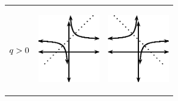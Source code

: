 \begin{center}
\begin{xtabular*}{\mytablewidth}[t]{|p{10\mystarwidth}|p{10\mystarwidth}|p{10\mystarwidth}|}
    
        
                  \begin{math}q>{}0\end{math}
                 &
    
    
        
                  
    \setcounter{subfigure}{0}

\label{m39341*id246931}
    \begin{center}
    \label{m39341*id246931!!!underscore!!!media}\label{m39341*id246931!!!underscore!!!printimage}\includegraphics[width=100px]{col11306.imgs/m39341_MG10C11_022.png} %
        
      \vspace{2pt}
    \vspace{.1in}
    
    \end{center}



    \addtocounter{footnote}{-0}
    
                 &
    
    
        
                  
    \setcounter{subfigure}{0}

\label{m39341*id246943}
    \begin{center}
    \label{m39341*id246943!!!underscore!!!media}\label{m39341*id246943!!!underscore!!!printimage}\includegraphics[width=100px]{col11306.imgs/m39341_MG10C11_023.png} %
        

\end{center}
\end{xtabular*}
\end{center}
